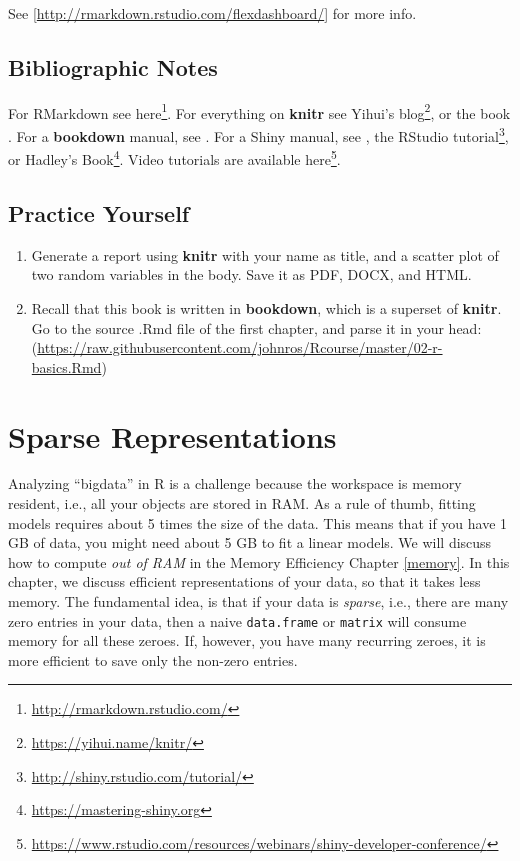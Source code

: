\documentclass[]{book}
\renewcommand{\href}[2]{#2\footnote{\url{#1}}}
\theoremstyle{definition}
\theoremstyle{definition}
\theoremstyle{definition}
\theoremstyle{remark}
\begin{document}
See {[}\url{http://rmarkdown.rstudio.com/flexdashboard/}{]} for more info.

\hypertarget{bibliographic-notes-11}{%
\section{Bibliographic Notes}\label{bibliographic-notes-11}}

For RMarkdown see \href{http://rmarkdown.rstudio.com/}{here}.
For everything on \textbf{knitr} see \href{https://yihui.name/knitr/}{Yihui's blog}, or the book \citet{xie2015dynamic}.
For a \textbf{bookdown} manual, see \citet{xie2016bookdown}.
For a Shiny manual, see \citet{shiny}, the \href{http://shiny.rstudio.com/tutorial/}{RStudio tutorial}, or \href{https://mastering-shiny.org}{Hadley's Book}.
Video tutorials are available \href{https://www.rstudio.com/resources/webinars/shiny-developer-conference/}{here}.

\hypertarget{practice-yourself-9}{%
\section{Practice Yourself}\label{practice-yourself-9}}

\begin{enumerate}
\def\labelenumi{\arabic{enumi}.}
\item
  Generate a report using \textbf{knitr} with your name as title, and a scatter plot of two random variables in the body. Save it as PDF, DOCX, and HTML.
\item
  Recall that this book is written in \textbf{bookdown}, which is a superset of \textbf{knitr}. Go to the source .Rmd file of the first chapter, and parse it in your head:
  (\url{https://raw.githubusercontent.com/johnros/Rcourse/master/02-r-basics.Rmd})
\end{enumerate}

\hypertarget{sparse}{%
\chapter{Sparse Representations}\label{sparse}}

Analyzing ``bigdata'' in R is a challenge because the workspace is memory resident, i.e., all your objects are stored in RAM.
As a rule of thumb, fitting models requires about 5 times the size of the data.
This means that if you have 1 GB of data, you might need about 5 GB to fit a linear models.
We will discuss how to compute \emph{out of RAM} in the Memory Efficiency Chapter \ref{memory}.
In this chapter, we discuss efficient representations of your data, so that it takes less memory.
The fundamental idea, is that if your data is \emph{sparse}, i.e., there are many zero entries in your data, then a naive \texttt{data.frame} or \texttt{matrix} will consume memory for all these zeroes.
If, however, you have many recurring zeroes, it is more efficient to save only the non-zero entries.
\end{document}
